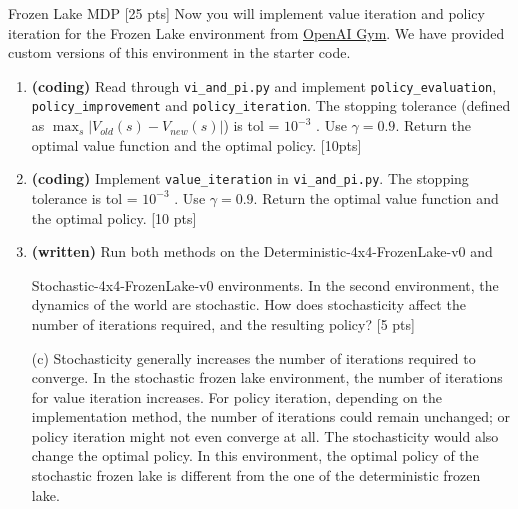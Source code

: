 \documentclass[11pt]{article}
\begin{document}
\begin{section}{Frozen Lake MDP [25 pts]}
Now you will implement value iteration and policy iteration for the Frozen Lake environment
from \href{"https://gym.openai.com/envs/FrozenLake-v0"}{OpenAI Gym}. We have provided
custom versions of this environment in the starter code.
\begin{enumerate}[label=(\alph*)]
\item \textbf{(coding)} Read through \texttt{vi\_and\_pi.py} and implement \texttt{policy\_evaluation}, \texttt{policy\_improvement} and \texttt{policy\_iteration}. The stopping tolerance (defined as $\max_s |V_{old}(s) - V_{new}(s)|$) is tol = $10^{-3}$
. Use $\gamma = 0.9$. Return the optimal value function and the optimal policy. [10pts]
\item \textbf{(coding)} Implement \texttt{value\_iteration} in \texttt{vi\_and\_pi.py}. The stopping tolerance is tol =
$10^{-3}$
. Use $\gamma = 0.9$. Return the optimal value function and the optimal policy. [10 pts]
\item \textbf{(written)} Run both methods on the Deterministic-4x4-FrozenLake-v0 and

Stochastic-4x4-FrozenLake-v0 environments. In the second environment, the dynamics of the world are stochastic. How does stochasticity affect the number of iterations required, and the resulting policy? [5 pts]

\end{enumerate}
\end{section}

\begin{tcolorbox}[breakable]
\begin{enumerate}
    \item[(c)] Stochasticity generally increases the number of iterations required to converge. In the stochastic frozen lake environment, the number of iterations for value iteration increases. For policy iteration, depending on the implementation method, the number of iterations could remain unchanged; or policy iteration might not even converge at all. The stochasticity would also change the optimal policy. In this environment, the optimal policy of the stochastic frozen lake is different from the one of the deterministic frozen lake.
\end{enumerate}


\end{tcolorbox}
\end{document}

